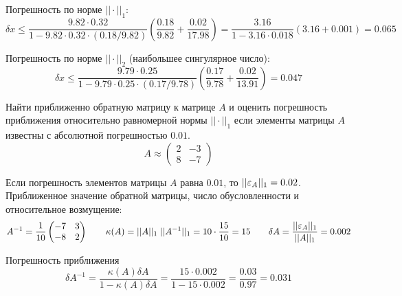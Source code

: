 Погрешность по норме $||\cdot||_1$:
\begin{equation*}
    \delta{x} \leq
    \frac{9.82\cdot{0.32}}{1-9.82\cdot{0.32}\cdot{(0.18/9.82)}}
    \left(\frac{0.18}{9.82} + \frac{0.02}{17.98}\right)
    =
    \frac{3.16}{1 - 3.16\cdot{0.018}} \left(3.16 + 0.001\right)
    =
    0.065
\end{equation*}

Погрешность по норме $||\cdot||_2$ (наибольшее сингулярное число):
\begin{equation*}
    \delta{x} \leq
    \frac{9.79\cdot{0.25}}{1-9.79\cdot{0.25}\cdot{(0.17/9.78)}}
    \left(\frac{0.17}{9.78} + \frac{0.02}{13.91}\right)
    =
    0.047
\end{equation*}


\begin{problem}
    Найти приближенно обратную матрицу к матрице $A$ и оценить погрешность
    приближения относительно равномерной нормы $||\cdot||_1$ если элементы
    матрицы $A$ известны с абсолютной погрешностью $0.01$.
    \begin{equation*}
        A \approx \begin{pmatrix}
            2 & -3\\
            8 & -7
        \end{pmatrix}
    \end{equation*}
\end{problem}


Если погрешность элементов матрицы $A$ равна $0.01$, то $||\varepsilon_A||_1 = 0.02$.
Приближенное значение обратной матрицы, число обусловленности и относительное
возмущение:
\begin{equation*}
    A^{-1} = \frac{1}{10}
    \begin{pmatrix}
        -7 & 3\\
        -8 & 2
    \end{pmatrix}
    \qquad
    \kappa(A) = ||A||_1 \; ||A^{-1}||_1 =  10 \cdot \frac{15}{10} = 15
    \qquad
    \delta{A} = \frac{||\varepsilon_A||_1}{||A||_1} = 0.002
\end{equation*}

Погрешность приближения
\begin{equation*}
    \delta{A^{-1}} = \frac{\kappa(A) \delta{A}}{1 - \kappa(A) \delta{A}}
    =
    \frac{15\cdot{0.002}}{1-15\cdot{0.002}} = \frac{0.03}{0.97} = 0.031
\end{equation*}